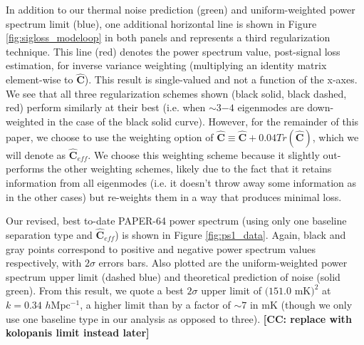 \documentclass[preprint2,numberedappendix,tighten]{aastex6}  %
\newcommand{\cc}[1]{{\color{purple} \textbf{[CC: #1]}}}
\begin{document}
In addition to our thermal noise prediction (green) and uniform-weighted power spectrum limit (blue), one additional horizontal line is shown in Figure \ref{fig:sigloss_modeloop} 
in both panels and represents a third regularization technique. This line (red) denotes the power spectrum value, post-signal loss estimation, for inverse variance weighting (multiplying an identity 
matrix element-wise to $\widehat{\textbf{C}}$). This result is single-valued and not a function of the x-axes. We see that all three regularization schemes shown (black solid, black dashed, red) perform similarly at 
their best (i.e. when $\sim3$$-4$ eigenmodes are down-weighted in the case of the black solid curve). However, for the remainder of this paper, we choose to use the weighting option of $\widehat{\textbf{C}} \equiv \widehat{\textbf{C}} + 0.04Tr(\widehat{\textbf{C}})$, which we will denote as $\widehat{\textbf{C}}_{eff}$. We choose this weighting scheme because it slightly out-performs the other weighting schemes, likely due to the fact that it retains information from all eigenmodes (i.e. it doesn't throw away some information as in the other cases) but re-weights them in a way that produces minimal loss.

Our revised, best to-date PAPER-64 power spectrum (using only one baseline separation type and $\widehat{\textbf{C}}_{eff}$) is shown in Figure 
\ref{fig:ps1_data}. Again, black and gray points correspond to positive and negative power spectrum values respectively, with 
$2\sigma$ errors bars. Also plotted are the uniform-weighted power spectrum upper limit (dashed blue) and theoretical prediction of 
noise (solid green). From this result, we quote a best $2\sigma$ upper limit of $(151.0$ mK$)^{2}$ at $k=0.34$ $h$Mpc$^{-1}$, 
a higher limit than  by a factor of $\sim7$ in mK (though we only use one baseline type in our analysis as opposed to three). 
\cc{replace with kolopanis limit instead later}
\end{document}
